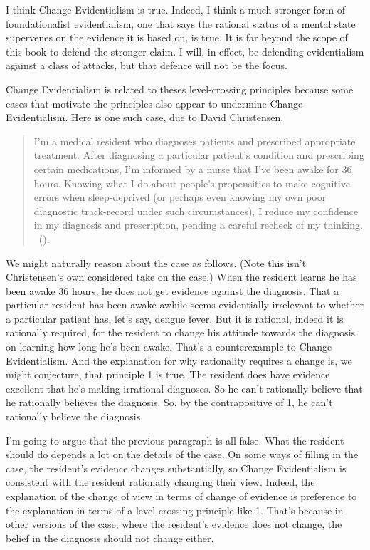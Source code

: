 \documentclass[
  10pt,
  letterpaper,
  twoside]{scrbook}
\begin{document}
I think Change Evidentialism is true. Indeed, I think a much stronger
form of foundationalist evidentialism, one that says the rational status
of a mental state supervenes on the evidence it is based on, is true. It
is far beyond the scope of this book to defend the stronger claim. I
will, in effect, be defending evidentialism against a class of attacks,
but that defence will not be the focus.

Change Evidentialism is related to theses level-crossing principles
because some cases that motivate the principles also appear to undermine
Change Evidentialism. Here is one such case, due to David Christensen.

\begin{quote}
I'm a medical resident who diagnoses patients and prescribed appropriate
treatment. After diagnosing a particular patient's condition and
prescribing certain medications, I'm informed by a nurse that I've been
awake for 36 hours. Knowing what I do about people's propensities to
make cognitive errors when sleep-deprived (or perhaps even knowing my
own poor diagnostic track-record under such circumstances), I reduce my
confidence in my diagnosis and prescription, pending a careful recheck
of my thinking. ~().
\end{quote}

We might naturally reason about the case as follows. (Note this isn't
Christensen's own considered take on the case.) When the resident learns
he has been awake 36 hours, he does not get evidence against the
diagnosis. That a particular resident has been awake awhile seems
evidentially irrelevant to whether a particular patient has, let's say,
dengue fever. But it is rational, indeed it is rationally required, for
the resident to change his attitude towards the diagnosis on learning
how long he's been awake. That's a counterexample to Change
Evidentialism. And the explanation for why rationality requires a change
is, we might conjecture, that principle 1 is true. The resident does
have evidence excellent that he's making irrational diagnoses. So he
can't rationally believe that he rationally believes the diagnosis. So,
by the contrapositive of 1, he can't rationally believe the diagnosis.

I'm going to argue that the previous paragraph is all false. What the
resident should do depends a lot on the details of the case. On some
ways of filling in the case, the resident's evidence changes
substantially, so Change Evidentialism is consistent with the resident
rationally changing their view. Indeed, the explanation of the change of
view in terms of change of evidence is preference to the explanation in
terms of a level crossing principle like 1. That's because in other
versions of the case, where the resident's evidence does not change, the
belief in the diagnosis should not change either.
\end{document}
